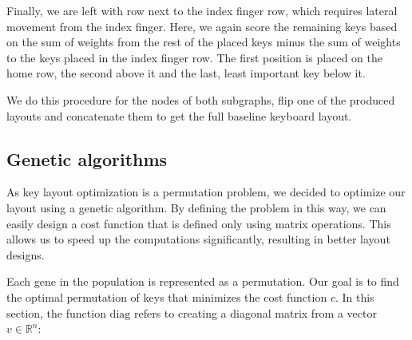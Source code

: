 \documentclass[9pt,twocolumn,twoside]{pnas-report}
\begin{document}
{Finally, we are left with row next to the index finger row, which requires lateral movement from the index finger.
Here, we again score the remaining keys based on the sum of weights from the rest of the placed keys minus the sum of weights to the keys placed in the index finger row.
The first position is placed on the home row, the second above it and the last, least important key below it.

We do this procedure for the nodes of both subgraphs, flip one of the produced layouts and concatenate them to get the full baseline keyboard layout.

\subsection*{Genetic algorithms}

As key layout optimization is a permutation problem, we decided to optimize our layout using a genetic algorithm.
By defining the problem in this way, we can easily design a cost function that is defined only using matrix operations.
This allows us to speed up the computations significantly, resulting in better layout designs.

Each gene in the population is represented as a permutation.
Our goal is to find the optimal permutation of keys that minimizes the cost function $c$.
In this section, the function $\text{diag}$ refers to creating a diagonal matrix from a vector $v \in \mathbb{R}^n$:

}
\end{document}
